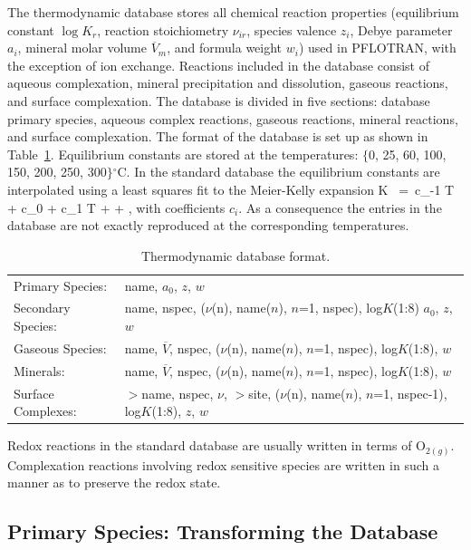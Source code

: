 \documentclass[12pt]{article}
\def\EQ#1\EN{\begin{equation}#1\end{equation}}
\newcommand{\eq}{\ =\ }
\newcommand{\degc}{$^\circ$C}
\begin{document}
The thermodynamic database stores all chemical reaction properties (equilibrium constant $\log K_r$, reaction stoichiometry $\nu_{ir}$, species valence $z_i$, Debye parameter $a_i$, mineral molar volume $\overline V_m$, and formula weight $w_i$) used in PFLOTRAN, with the exception of ion exchange. Reactions included in the database consist of aqueous complexation, mineral precipitation and dissolution, gaseous reactions, and surface complexation. The database is divided in five sections: database primary species, aqueous complex reactions, gaseous reactions, mineral reactions, and surface complexation. The format of the database is set up as shown in Table~\ref{tdatabase}. Equilibrium constants are stored at the temperatures: $\{$0, 25, 60, 100, 150, 200, 250, 300$\}$\degc. In the standard database the equilibrium constants are interpolated using a least squares fit to the Meier-Kelly expansion
\EQ
\log K \eq c_{-1} \ln T + c_0 + c_1 T +  + ,
\EN
with coefficients $c_i$. As a consequence the entries in the database are not exactly reproduced at the corresponding temperatures. 

\begin{table}[h]\centering
\caption{Thermodynamic database format.}\label{tdatabase}
\vspace{3mm}
\begin{tabular}{ll}
\hline
Primary Species: & name, $a_0$, $z$, $w$\\
Secondary Species: & name, nspec, ($\nu$(n), name($n$), $n$=1, nspec), log$K$(1:8) $a_0$, $z$, $w$\\
Gaseous Species: & name, $\overline V$, nspec, ($\nu$(n), name($n$), $n$=1, nspec), log$K$(1:8), $w$ \\
Minerals: & name, $\overline V$, nspec, ($\nu$(n), name($n$), $n$=1, nspec), log$K$(1:8), $w$\\
Surface Complexes: & $>$name, nspec, $\nu$, $>$site, 
($\nu$(n), name($n$), $n$=1, nspec-1), log$K$(1:8), $z$, $w$\\
\hline
\end{tabular}
\end{table}

Redox reactions in the standard database are usually written in terms of O$_{2(g)}$.
Complexation reactions involving redox sensitive species are written in such a manner as to preserve the redox state.

\subsection{Primary Species: Transforming the Database}
\end{document}

